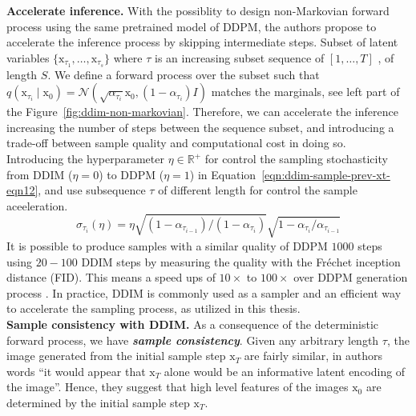 \noindent \textbf{Accelerate inference.} With the possiblity to design non-Markovian forward process using the same pretrained model of DDPM, the authors propose to accelerate the inference process by skipping intermediate steps. Subset of latent variables $\{\mathrm{x}_{\tau_1}, \dots, \mathrm{x}_{\tau_{s}} \}$ where $\tau$ is an increasing subset sequence of $[1, \dots, T]$ , of length $S$. We define a forward process over the subset such that $q(\mathrm{x}_{\tau_i}\mid\mathrm{x}_{0})=\mathcal{N}(\sqrt{\alpha_{\tau_{i}}}\mathrm{x}_{0}, (1-\alpha_{\tau_{i}})I)$ matches the marginals, see left part of the Figure~\ref{fig:ddim-non-markovian}. Therefore, we can accelerate the inference increasing the number of steps between the sequence subset, and introducing a trade-off between sample quality and computational cost in doing so. \\

\noindent Introducing the hyperparameter $\eta\in\mathbb{R}^{+}$ for control the
sampling stochasticity from DDIM ($\eta=0$) to DDPM ($\eta=1$) in Equation~\ref{eqn:ddim-sample-prev-xt-eqn12}, and use subsequence $\tau$ of different length 
for control the sample aceeleration.
\begin{equation}\label{eqn:ddim-to-ddpm-variance}
    \sigma_{\tau_{i}}(\eta) = \eta \sqrt{(1-\alpha_{\tau_{i-1}}) / (1-\alpha_{\tau_{i}})}\sqrt{1-\alpha_{\tau_{i}}/\alpha_{\tau_{i-1}}}
\end{equation}
It is possible to produce samples with a similar quality of DDPM $1000$ steps using $20-100$ DDIM steps by measuring the quality with the Fréchet inception distance (FID). This means a speed ups of $10\times$ to $100\times$ over DDPM generation process \cite{song2020denoising}. In practice, DDIM is commonly used as a sampler and an efficient way to accelerate the sampling process, as utilized in this thesis. \\

\noindent \textbf{Sample consistency with DDIM.}  As a consequence of the deterministic forward process, we have \textit{\textbf{sample consistency}}. Given any arbitrary length $\tau$, the image generated from the initial sample step $\mathrm{x}_{T}$ are fairly similar, in authors words ``it would appear that $\mathrm{x}_{T}$ alone would be an informative latent encoding of the image''.  Hence, they suggest that high level features of the images $\mathrm{x}_{0}$ are determined by the initial sample step $\mathrm{x}_{T}$. \\

